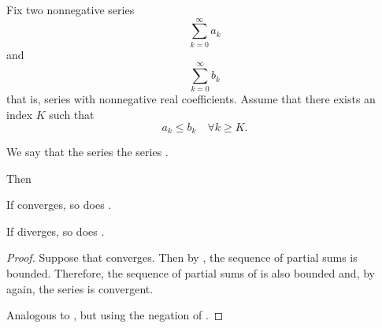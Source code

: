 \begin{proposition}\label{thm:positive_series_comparison}
  Fix two nonnegative series
  \begin{equation}\label{def:positive_series_comparison/a}
    \sum_{k=0}^\infty a_k
  \end{equation}
  and
  \begin{equation}\label{def:positive_series_comparison/b}
    \sum_{k=0}^\infty b_k
  \end{equation}
  that is, series with nonnegative real coefficients. Assume that there exists an index \( K \) such that
  \begin{equation*}
    a_k \leq b_k \quad\forall k \geq K.
  \end{equation*}

  We say that the series   the series .

  Then
  \begin{thmenum}
     If  converges, so does .

     If  diverges, so does .
  \end{thmenum}
\end{proposition}
\begin{proof}
   Suppose that  converges. Then by , the sequence of partial sums is bounded. Therefore, the sequence of partial sums of  is also bounded and, by  again, the series is convergent.

   Analogous to , but using the negation of .
\end{proof}

